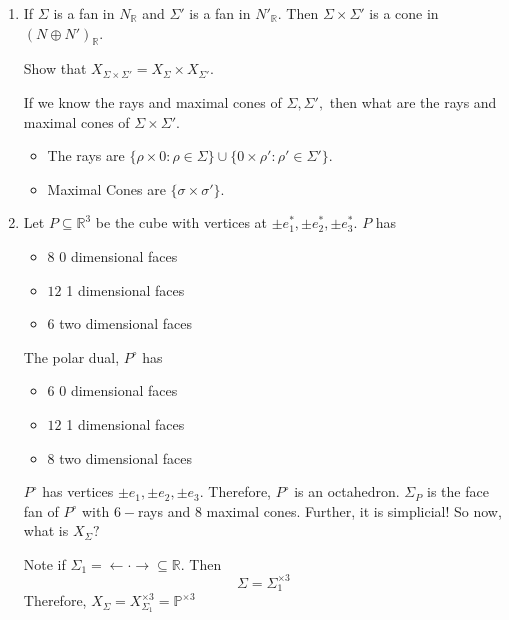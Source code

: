 \documentclass[a4paper,12pt]{amsart}
\newcommand{\R}{\ensuremath{\mathbb{R}}}
\begin{document}
\begin{enumerate}
\item If $\Sigma$ is a fan in $N_\R$  and $\Sigma'$ is a fan in $N'_\R.$ Then $\Sigma\times \Sigma'$ is a cone in $(N\oplus  N')_\R.$ 
\begin{exercise}
	Show that $X_{\Sigma\times \Sigma'} =X_\Sigma\times X_{\Sigma'}.$
\end{exercise} 
 	If we know the rays and maximal cones of $\Sigma,\Sigma',$ then what are the rays and maximal cones of $\Sigma\times \Sigma'.$ 
 	\begin{itemize}
 		\item The rays are $\{ \rho\times 0:\rho\in \Sigma\} \cup   \{ 0\times \rho':\rho'\in \Sigma'\}.$ 
 		\item Maximal Cones are $\{\sigma\times \sigma'\}.$     
 	\end{itemize}
 	
 	
 	
\item Let $P\subseteq \R^3$ be the cube with vertices at $\pm e_1^*, \pm e_2^*, \pm 			e_3^*.$ $P$ has \begin{itemize}
	\item $8$ 0 dimensional  faces
	\item $12$ 1 dimensional faces
	\item $6$ two dimensional faces
	\end{itemize}
	The polar dual, $P^\circ$ has 
	\begin{itemize}
	\item $6$ 0 dimensional  faces
	\item $12$ 1 dimensional faces
	\item $8$ two dimensional faces
	\end{itemize}
	$P^\circ$ has vertices $\pm e_1,\pm e_2,\pm e_3.$ Therefore, $P^\circ$ is an 					octahedron. $\Sigma_P$ is the face fan of $P^\circ$ with $6-$rays and $8$ maximal 		cones. Further, it is simplicial! So now, what is $X_\Sigma?$
	
	Note if $\Sigma_1=\leftarrow \cdot \rightarrow \subseteq \R.$
	Then \[\Sigma=\Sigma_1^{\times 3}\]
	Therefore, $X_\Sigma=X_{\Sigma_1}^{\times 3}=\mathbb{P}^{\times 3}$	
\end{enumerate}
\end{document}
